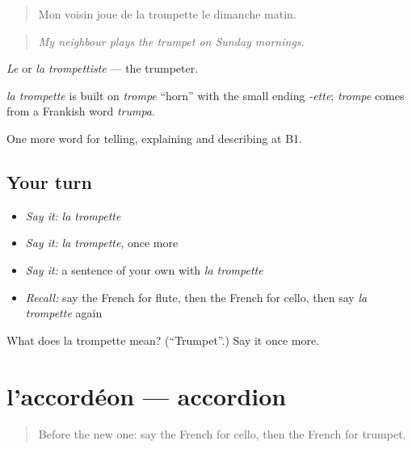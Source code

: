 \begin{quote}
Mon voisin joue de la trompette le dimanche matin.
\end{quote}

\begin{quote}
\emph{My neighbour plays the trumpet on Sunday mornings.}
\end{quote}

\emph{Le} or \emph{la trompettiste} — the trumpeter.

\begin{cousinweb}
\emph{la trompette} is built on \emph{trompe} \textquotedblleft{}horn\textquotedblright{} with the small ending \emph{-ette}; \emph{trompe} comes from a Frankish word \emph{trumpa}.
\end{cousinweb}

\begin{grammarlens}[title={What you've built}]
One more word for telling, explaining and describing at B1.
\end{grammarlens}

\subsection*{Your turn}
\begin{itemize}
\raggedright
  \item \emph{Say it:} \emph{la trompette}
  \item \emph{Say it:} \emph{la trompette}, once more
  \item \emph{Say it:} a sentence of your own with \emph{la trompette}
  \item \emph{Recall:} say the French for flute, then the French for cello, then say \emph{la trompette} again
\end{itemize}

\begin{tcolorbox}[breakable,colback=teal!4,colframe=teal!35!black,title={Before you move on}]
What does la trompette mean? (\textquotedblleft{}Trumpet\textquotedblright{}.) Say it once more.
\end{tcolorbox}
\section[l'accordéon]{l'accordéon — accordion}

\label{lesson:FR-C511-accordeon}



\begin{quote}
Before the new one: say the French for cello, then the French for trumpet.
\end{quote}

